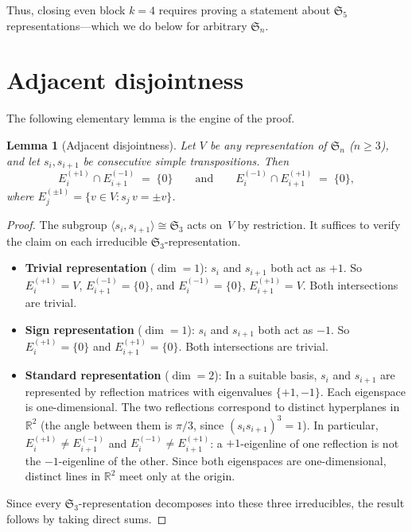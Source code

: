 \documentclass[11pt]{article}
\newtheorem{lemma}[theorem]{Lemma}
\theoremstyle{definition}
\theoremstyle{remark}
\newcommand{\Sym}{\mathfrak{S}}
\begin{document}
\noindent
Thus, closing even block $k = 4$ requires proving a statement about
$\Sym_5$ representations---which we do below for arbitrary $\Sym_n$.


\section{Adjacent disjointness}

The following elementary lemma is the engine of the proof.

\begin{lemma}[Adjacent disjointness]\label{lem:adj-disj}
Let $V$ be any representation of\/ $\Sym_n$ ($n \ge 3$), and let
$s_i, s_{i+1}$ be consecutive simple transpositions.  Then
\[
  E_i^{(+1)} \cap E_{i+1}^{(-1)} \;=\; \{0\}
  \qquad\text{and}\qquad
  E_i^{(-1)} \cap E_{i+1}^{(+1)} \;=\; \{0\},
\]
where $E_j^{(\pm 1)} = \{v \in V : s_j\, v = \pm v\}$.
\end{lemma}

\begin{proof}
The subgroup $\langle s_i, s_{i+1} \rangle \cong \Sym_3$ acts on~$V$
by restriction.  It suffices to verify the claim on each irreducible
$\Sym_3$-representation.

\begin{itemize}
  \item \textbf{Trivial representation} ($\dim = 1$):
    $s_i$ and $s_{i+1}$ both act as $+1$.
    So $E_i^{(+1)} = V$, $E_{i+1}^{(-1)} = \{0\}$,
    and $E_i^{(-1)} = \{0\}$, $E_{i+1}^{(+1)} = V$.
    Both intersections are trivial.

  \item \textbf{Sign representation} ($\dim = 1$):
    $s_i$ and $s_{i+1}$ both act as $-1$.
    So $E_i^{(+1)} = \{0\}$ and $E_{i+1}^{(+1)} = \{0\}$.
    Both intersections are trivial.

  \item \textbf{Standard representation} ($\dim = 2$):
    In a suitable basis, $s_i$ and $s_{i+1}$ are represented by
    reflection matrices with eigenvalues $\{+1, -1\}$.
    Each eigenspace is one-dimensional.  The two reflections
    correspond to distinct hyperplanes in $\mathbb{R}^2$
    (the angle between them is $\pi/3$, since
    $(s_i s_{i+1})^3 = 1$).  In particular,
    $E_i^{(+1)} \ne E_{i+1}^{(-1)}$ and
    $E_i^{(-1)} \ne E_{i+1}^{(+1)}$: a $+1$-eigenline of one
    reflection is not the $-1$-eigenline of the other.
    Since both eigenspaces are one-dimensional, distinct lines
    in $\mathbb{R}^2$ meet only at the origin.
\end{itemize}

\noindent
Since every $\Sym_3$-representation decomposes into these three
irreducibles, the result follows by taking direct sums.
\end{proof}
\end{document}
